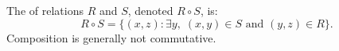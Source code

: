The  of relations $R$ and $S$, denoted $R \circ S$, is:
$$
R \circ S = \{(x,z): \exists y,\; (x,y) \in S \text{ and } (y,z) \in R\}.
$$
Composition is generally not commutative.
